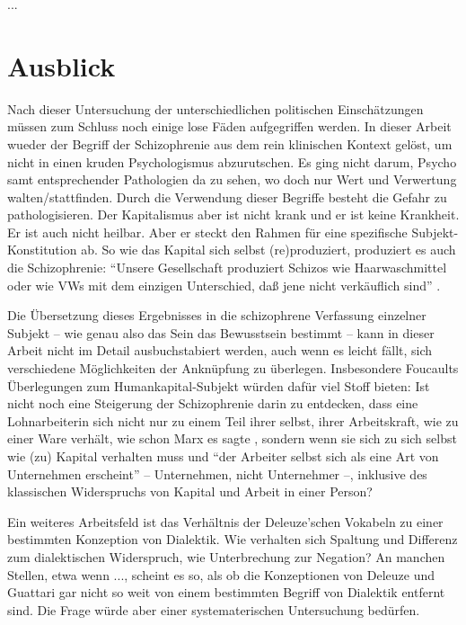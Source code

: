 \documentclass[12pt,
               DIV13,
               paper=a4,
               twoside=false,
               onehalfspacing,
               bibliography=totoc,
               toc=graduated,
               draft,
               ]{scrartcl}
\newcommand{\pc}[2]{\parencite[#1]{#2}}
\newcommand{\vgl}[2]{\parencite[vgl.][#1]{#2}}
\begin{document}
...



\section{Ausblick}

Nach dieser Untersuchung der unterschiedlichen politischen
Einschätzungen müssen zum Schluss noch einige lose Fäden aufgegriffen
werden. In dieser Arbeit wueder der Begriff der Schizophrenie aus dem
rein klinischen Kontext gelöst, um nicht in einen kruden
Psychologismus abzurutschen. Es ging nicht darum, Psycho samt
entsprechender Pathologien da zu sehen, wo doch nur Wert und
Verwertung walten/stattfinden. Durch die Verwendung dieser Begriffe
besteht die Gefahr zu pathologisieren. Der Kapitalismus aber ist nicht
krank und er ist keine Krankheit. Er ist auch nicht heilbar. Aber er
steckt den Rahmen für eine spezifische Subjekt-Konstitution ab. So wie
das Kapital sich selbst (re)produziert, produziert es auch die
Schizophrenie: "`Unsere Gesellschaft produziert Schizos wie
Haarwaschmittel oder wie VWs mit dem einzigen Unterschied, daß jene
nicht verkäuflich sind"' \pc{S. 315 f.}{ao}.

Die Übersetzung dieses Ergebnisses in die schizophrene Verfassung
einzelner Subjekt -- wie genau also das Sein das Bewusstsein bestimmt
-- kann in dieser Arbeit nicht im Detail ausbuchstabiert werden, auch
wenn es leicht fällt, sich verschiedene Möglichkeiten der Anknüpfung
zu überlegen. Insbesondere Foucaults Überlegungen zum
Humankapital-Subjekt würden dafür viel Stoff bieten: Ist nicht noch
eine Steigerung der Schizophrenie darin zu entdecken, dass eine
Lohnarbeiterin sich nicht nur zu einem Teil ihrer selbst, ihrer
Arbeitskraft, wie zu einer Ware verhält, wie schon Marx es sagte
\vgl{182}{kap}, sondern wenn sie sich zu sich selbst wie (zu) Kapital
verhalten muss und "`der Arbeiter selbst sich als eine Art von
Unternehmen erscheint"' \pc{313}{gbp} -- Unternehmen, nicht
Unternehmer --, inklusive des klassischen Widerspruchs von Kapital und
Arbeit in einer Person?

Ein weiteres Arbeitsfeld ist das Verhältnis der Deleuze'schen Vokabeln
zu einer bestimmten Konzeption von Dialektik. Wie verhalten sich
Spaltung und Differenz zum dialektischen Widerspruch, wie
Unterbrechung zur Negation? An manchen Stellen, etwa wenn ..., scheint
es so, als ob die Konzeptionen von Deleuze und Guattari gar nicht so
weit von einem bestimmten Begriff von Dialektik entfernt sind. Die
Frage würde aber einer systematerischen Untersuchung bedürfen.
\end{document}

